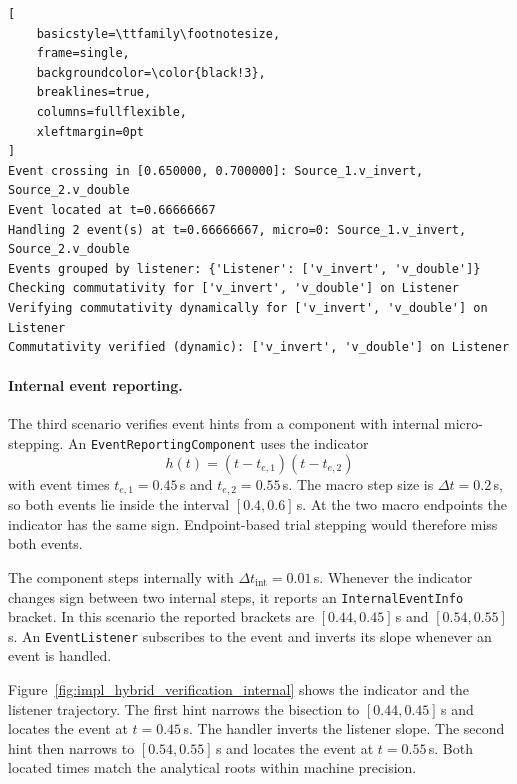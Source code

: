 \begin{listing}[!htbp]
\begin{lstlisting}[
    basicstyle=\ttfamily\footnotesize,
    frame=single,
    backgroundcolor=\color{black!3},
    breaklines=true,
    columns=fullflexible,
    xleftmargin=0pt
]
Event crossing in [0.650000, 0.700000]: Source_1.v_invert, Source_2.v_double
Event located at t=0.66666667
Handling 2 event(s) at t=0.66666667, micro=0: Source_1.v_invert, Source_2.v_double
Events grouped by listener: {'Listener': ['v_invert', 'v_double']}
Checking commutativity for ['v_invert', 'v_double'] on Listener
Verifying commutativity dynamically for ['v_invert', 'v_double'] on Listener
Commutativity verified (dynamic): ['v_invert', 'v_double'] on Listener
\end{lstlisting}
\caption[Log output for the strong-simultaneity scenario]{Log output for the strong-simultaneity scenario.
The two events are localized at the same dense time and confirmed commutative before dispatch.}
\label{lst:hybrid_simultaneity_log}
\end{listing}

\paragraph{Internal event reporting.}
The third scenario verifies event hints from a component with internal micro-stepping.
An \texttt{EventReportingComponent} uses the indicator
\[
    h(t) = (t - t_{e,1})(t - t_{e,2})
\]
with event times $t_{e,1} = 0.45\,$s and $t_{e,2} = 0.55\,$s.
The macro step size is $\Delta t = 0.2\,$s, so both events lie inside the interval $[0.4,0.6]\,$s.
At the two macro endpoints the indicator has the same sign.
Endpoint-based trial stepping would therefore miss both events.

The component steps internally with $\Delta t_{\mathrm{int}} = 0.01\,$s.
Whenever the indicator changes sign between two internal steps, it reports an \texttt{InternalEventInfo} bracket.
In this scenario the reported brackets are $[0.44,0.45]\,$s and $[0.54,0.55]\,$s.
An \texttt{EventListener} subscribes to the event and inverts its slope whenever an event is handled.

Figure~\ref{fig:impl_hybrid_verification_internal} shows the indicator and the listener trajectory.
The first hint narrows the bisection to $[0.44, 0.45]\,$s and locates the event at $t = 0.45\,$s.
The handler inverts the listener slope.
The second hint then narrows to $[0.54, 0.55]\,$s and locates the event at $t = 0.55\,$s.
Both located times match the analytical roots within machine precision.


